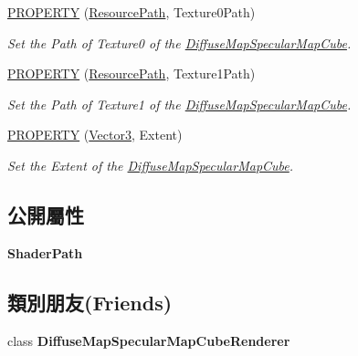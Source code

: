 \begin{DoxyCompactItemize}
\hyperlink{class_magnum_1_1_diffuse_map_specular_map_cube_ad5d896d73490a7c8c03c9968a762d359}{P\+R\+O\+P\+E\+R\+TY} (\hyperlink{class_magnum_1_1_resource_path}{Resource\+Path}, Texture0\+Path)
\begin{DoxyCompactList}\small\item\em Set the Path of Texture0 of the \hyperlink{class_magnum_1_1_diffuse_map_specular_map_cube}{Diffuse\+Map\+Specular\+Map\+Cube}. \end{DoxyCompactList}\item 
\hyperlink{class_magnum_1_1_diffuse_map_specular_map_cube_a6743f9605327db450e5bef114f81d151}{P\+R\+O\+P\+E\+R\+TY} (\hyperlink{class_magnum_1_1_resource_path}{Resource\+Path}, Texture1\+Path)
\begin{DoxyCompactList}\small\item\em Set the Path of Texture1 of the \hyperlink{class_magnum_1_1_diffuse_map_specular_map_cube}{Diffuse\+Map\+Specular\+Map\+Cube}. \end{DoxyCompactList}\item 
\hyperlink{class_magnum_1_1_diffuse_map_specular_map_cube_a7fee4399e9184b4bccd152820ebd45e3}{P\+R\+O\+P\+E\+R\+TY} (\hyperlink{class_magnum_1_1_vector3}{Vector3}, Extent)
\begin{DoxyCompactList}\small\item\em Set the Extent of the \hyperlink{class_magnum_1_1_diffuse_map_specular_map_cube}{Diffuse\+Map\+Specular\+Map\+Cube}. \end{DoxyCompactList}\end{DoxyCompactItemize}
\subsection*{公開屬性}
\begin{DoxyCompactItemize}
\item 
{\bfseries Shader\+Path}\hypertarget{class_magnum_1_1_diffuse_map_specular_map_cube_a1a82e7e6baf96be6574ec5965b44d6ae}{}\label{class_magnum_1_1_diffuse_map_specular_map_cube_a1a82e7e6baf96be6574ec5965b44d6ae}

\end{DoxyCompactItemize}
\subsection*{類別朋友(Friends)}
\begin{DoxyCompactItemize}
\item 
class {\bfseries Diffuse\+Map\+Specular\+Map\+Cube\+Renderer}\hypertarget{class_magnum_1_1_diffuse_map_specular_map_cube_a420645eea9386d7539d2f8ae059e75c3}{}\label{class_magnum_1_1_diffuse_map_specular_map_cube_a420645eea9386d7539d2f8ae059e75c3}

\end{DoxyCompactItemize}
